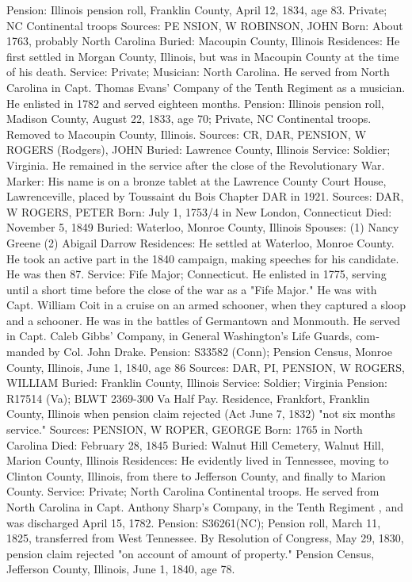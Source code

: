 Pension: Illinois pension roll, Franklin County, April 12, 1834, age 83. Private; NC Continental troops 
Sources: PE NSION, W 
ROBINSON, JOHN 
Born: About 1763, probably North Carolina 
Buried: Macoupin County, Illinois
Residences: He first settled in Morgan County, Illinois, but was in Macoupin County at the time of his death.
Service: Private; Musician: North Carolina. He served from North Carolina in Capt. Thomas Evans' Company of the Tenth Regiment as a musician. He enlisted in 1782 and served eighteen months. 
Pension: Illinois pension roll, Madison County, August 22, 1833, age 70; Private, NC Continental troops. Removed to Macoupin County, Illinois. 
Sources: CR, DAR, PENSION, W 
ROGERS (Rodgers), JOHN 
Buried: Lawrence County, Illinois 
Service: Soldier; Virginia. He remained in the service after the close of the Revolutionary War.
Marker: His name is on a bronze tablet at the Lawrence County Court House, Lawrenceville, placed by Toussaint du Bois Chapter DAR in 1921. 
Sources: DAR, W 
ROGERS, PETER 
Born: July 1, 1753/4 in New London, Connecticut 
Died: November 5, 1849 
Buried: Waterloo, Monroe County, Illinois 
Spouses:	(1) Nancy Greene 
(2) Abigail Darrow 
Residences: He settled at Waterloo, Monroe County. He took an active part in the 1840 campaign, making speeches for his candidate. He was then 87. 
Service: Fife Major; Connecticut. He enlisted in 1775, serving until a short time before the close of the war as a "Fife Major." He was with Capt. William Coit in a cruise on an armed schooner, when they captured a sloop and a schooner. He was in the battles of Germantown and Monmouth. He served in Capt. Caleb Gibbs' Company, in General Washington's Life Guards, com­manded by Col. John Drake. 
Pension: S33582 (Conn); Pension Census, Monroe County, Illinois, June 1, 1840, age 86 
Sources: DAR, PI, PENSION, W 
ROGERS, WILLIAM
Buried: Franklin County, Illinois 
Service: Soldier; Virginia 
Pension: R17514 (Va); BLWT 2369-300 Va Half Pay. Residence, Frankfort, Frank­lin County, Illinois when pension claim rejected (Act June 7, 1832) "not six months service." 
Sources: PENSION, W 
ROPER, GEORGE 
Born: 1765 in North Carolina 
Died: February 28, 1845 
Buried: Walnut Hill Cemetery, Walnut Hill, Marion County, Illinois 
Residences: He evidently lived in Tennessee, moving to Clinton County, Illinois, from there to Jefferson County, and finally to Marion County. 
Service: Private; North Carolina Continental troops. He served from North Caro­lina in Capt. Anthony Sharp's Company, in the Tenth Regiment , and was discharged April 15, 1782. 
Pension: S36261(NC); Pension roll, March 11, 1825, transferred from West Tennes­see. By Resolution of Congress, May 29, 1830, pension claim rejected "on account of amount of property." Pension Census, Jefferson County, Illinois, June 1, 1840, age 78. 
